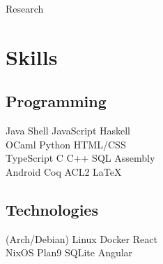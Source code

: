 \documentclass[letterpaper]{cv} %
\begin{document}
\begin{minipage}[t]{0.33\textwidth}
Research
\sectionspace


\section{Skills}

\subsection{Programming}
Java \textbullet{} Shell \textbullet{} JavaScript \textbullet{} Haskell \\
OCaml \textbullet{} Python \textbullet{} HTML/CSS \\
TypeScript \textbullet{}  C \textbullet{} C++ \textbullet{} SQL \textbullet{} Assembly \\
Android  \textbullet{} Coq \textbullet{} ACL2 \textbullet{} \LaTeX\ \\
\sectionspace

\subsection{Technologies}
(Arch/Debian) Linux  \textbullet{} Docker \textbullet{} React \\
NixOS \textbullet{} Plan9 \textbullet{} SQLite \textbullet{} Angular \\
\sectionspace

\end{minipage} %
\hfill
%
%
\end{document}
